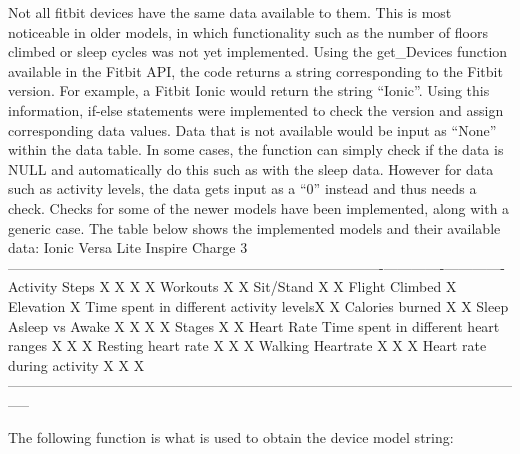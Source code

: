 \documentclass[]{book}
\begin{document}
Not all fitbit devices have the same data available to them. This is
most noticeable in older models, in which functionality such as the
number of floors climbed or sleep cycles was not yet implemented. Using
the get\_Devices function available in the Fitbit API, the code returns
a string corresponding to the Fitbit version. For example, a Fitbit
Ionic would return the string ``Ionic''. Using this information, if-else
statements were implemented to check the version and assign
corresponding data values. Data that is not available would be input as
``None'' within the data table. In some cases, the function can simply
check if the data is NULL and automatically do this such as with the
sleep data. However for data such as activity levels, the data gets
input as a ``0'' instead and thus needs a check. Checks for some of the
newer models have been implemented, along with a generic case. The table
below shows the implemented models and their available data: \textbar{}
\textbar{}Ionic \textbar{} Versa Lite \textbar{}Inspire \textbar{}Charge
3 \textbar{}
---------------\textbar{}---------------------------------------\textbar{}--------------\textbar{}-------------\textbar{}-------------\textbar{}-------------\textbar{}
Activity \textbar{}Steps \textbar{}X \textbar{}X \textbar{}X \textbar{}X
\textbar{} \textbar{}Workouts \textbar{}X \textbar{}X \textbar{}
\textbar{} \textbar{} \textbar{}Sit/Stand \textbar{}X \textbar{}X
\textbar{} \textbar{} \textbar{} \textbar{}Flight Climbed \textbar{}X
\textbar{} \textbar{} \textbar{} \textbar{} \textbar{}Elevation
\textbar{}X \textbar{} \textbar{} \textbar{} \textbar{} \textbar{}Time
spent in different activity levels\textbar{}X \textbar{}X \textbar{}
\textbar{} \textbar{} \textbar{}Calories burned \textbar{}X \textbar{}X
\textbar{} \textbar{} \textbar{} Sleep \textbar{}Asleep vs Awake
\textbar{}X \textbar{}X \textbar{}X \textbar{}X \textbar{}
\textbar{}Stages \textbar{}X \textbar{}X \textbar{} \textbar{}
\textbar{} Heart Rate \textbar{}Time spent in different heart ranges
\textbar{}X \textbar{}X \textbar{} \textbar{}X \textbar{}
\textbar{}Resting heart rate \textbar{}X \textbar{}X \textbar{}
\textbar{}X \textbar{} \textbar{}Walking Heartrate \textbar{}X
\textbar{}X \textbar{} \textbar{}X \textbar{} \textbar{}Heart rate
during activity \textbar{}X \textbar{}X \textbar{} \textbar{}X
\textbar{}
-----------------------------------------------------------------------------------------------------------------

The following function is what is used to obtain the device model
string:
\end{document}
